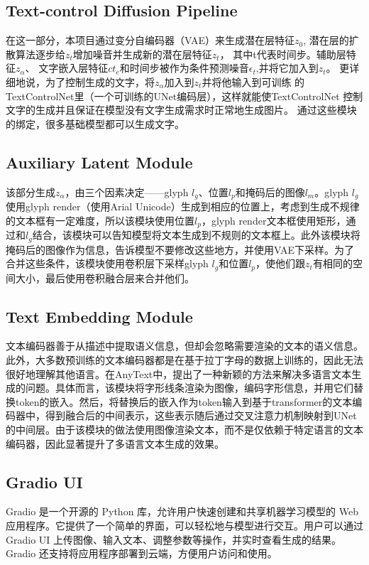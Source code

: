 \documentclass[a4paper,12pt]{article}
\begin{document}
\subsection{Text-control Diffusion Pipeline}
在这一部分，本项目通过变分自编码器（VAE）来生成潜在层特征$z_0$,
潜在层的扩散算法逐步给$z_t$增加噪音并生成新的潜在层特征$z_t$，
其中t代表时间步。辅助层特征$z_\alpha$、
文字嵌入层特征$ct_e$和时间步被作为条件预测噪音$\epsilon_t$,并将它加入到$z_t$。
更详细地说，为了控制生成的文字，将$z_\alpha$加入到$z_t$并将他输入到可训练
的TextControlNet里（一个可训练的UNet编码层），这样就能使TextControlNet
控制文字的生成并且保证在模型没有文字生成需求时正常地生成图片。
通过这些模块的绑定，很多基础模型都可以生成文字。
\subsection{Auxiliary Latent Module}
该部分生成$z_\alpha$，由三个因素决定——glyph $l_g$、位置$l_p$和掩码后的图像$l_m$。glyph $l_g$使用glyph render（使用Arial Unicode）生成到相应的位置上，考虑到生成不规律的文本框有一定难度，所以该模块使用位置$l_p$，glyph render文本框使用矩形，通过和$l_g$结合，该模块可以告知模型将文本生成到不规则的文本框上。此外该模块将掩码后的图像作为信息，告诉模型不要修改这些地方，并使用VAE下采样。为了合并这些条件，该模块使用卷积层下采样glyph $l_g$和位置$l_p$，使他们跟$z_t$有相同的空间大小，最后使用卷积融合层来合并他们。
\subsection{Text Embedding Module}
文本编码器善于从描述中提取语义信息，但却会忽略需要渲染的文本的语义信息。此外，大多数预训练的文本编码器都是在基于拉丁字母的数据上训练的，因此无法很好地理解其他语言。在AnyText中，提出了一种新颖的方法来解决多语言文本生成的问题。具体而言，该模块将字形线条渲染为图像，编码字形信息，并用它们替换token的嵌入。然后，将替换后的嵌入作为token输入到基于transformer的文本编码器中，得到融合后的中间表示，这些表示随后通过交叉注意力机制映射到UNet的中间层。由于该模块的做法使用图像渲染文本，而不是仅依赖于特定语言的文本编码器，因此显著提升了多语言文本生成的效果。
\subsection{Gradio UI}
Gradio 是一个开源的 Python 库，允许用户快速创建和共享机器学习模型的 Web 应用程序。它提供了一个简单的界面，可以轻松地与模型进行交互。用户可以通过 Gradio UI 上传图像、输入文本、调整参数等操作，并实时查看生成的结果。Gradio 还支持将应用程序部署到云端，方便用户访问和使用。
\end{document}
